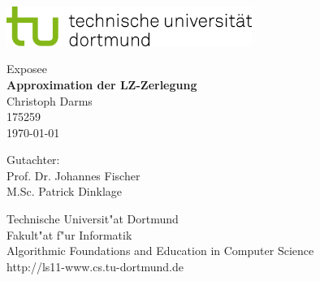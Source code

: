 \begin{titlepage}
		\vspace*{-3cm}
		\newlength{\links}
		\setlength{\links}{-1.5cm}
		\sffamily
		\hspace*{\links}
		\begin{minipage}{12.5cm}
			\includegraphics[width=8cm]{tud_logo_rgb}
		\end{minipage}
		
		\vspace*{3cm}
		
		\hspace*{\links}
		\hspace*{-0.2cm}
		\begin{minipage}{9cm}
			\large
			\begin{center}
				{\Large Exposee} \\
				\vspace*{1cm}
				\textbf{Approximation der LZ-Zerlegung} \\
				\vspace*{1cm}
				Christoph Darms\\
				175259\\
				\today
			\end{center}
		\end{minipage}
		\normalsize
		\vspace*{5.5cm}
		
		
		\vspace*{2.1cm}
		
		\hspace*{\links}
		\begin{minipage}[b]{5cm}
			\raggedright
			Gutachter: \\
			Prof. Dr. Johannes Fischer \\
			M.Sc. Patrick Dinklage
		\end{minipage}
		
		\vspace*{2.5cm}
		\hspace*{\links}
		\begin{minipage}[b]{8cm}
			\raggedright
			Technische Universit"at Dortmund \\
			Fakult"at f"ur Informatik\\
			Algorithmic Foundations and Education in Computer Science\\
			http://ls11-www.cs.tu-dortmund.de
		\end{minipage}
		
		
	\end{titlepage}
